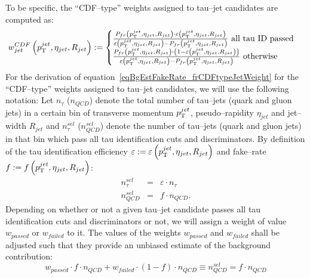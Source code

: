 To be specific, the ``CDF--type'' weights assigned to tau--jet candidates are
computed as:
\begin{equation}
w_{jet}^{CDF} \left( p_{\mathrm{T}}^{jet}, \eta_{jet}, R_{jet} \right) 
:= 
\begin{cases} 
   \frac{P_{fr} \left( p_{\mathrm{T}}^{jet}, \eta_{jet}, R_{jet} \right) \cdot 
         \varepsilon \left( p_{\mathrm{T}}^{jet}, \eta_{jet}, R_{jet} \right)}
        {\varepsilon \left( p_{\mathrm{T}}^{jet}, \eta_{jet}, R_{jet} \right) - P_{fr} \left( p_{\mathrm{T}}^{jet}, \eta_{jet}, R_{jet} \right)}~\mbox{all tau ID passed} \\
   \frac{P_{fr} \left( p_{\mathrm{T}}^{jet}, \eta_{jet}, R_{jet} \right) \cdot 
         \left( 1 - \varepsilon \left( p_{\mathrm{T}}^{jet}, \eta_{jet}, R_{jet} \right) \right)}
        {\varepsilon \left( p_{\mathrm{T}}^{jet}, \eta_{jet}, R_{jet} \right) - P_{fr} \left( p_{\mathrm{T}}^{jet}, \eta_{jet}, R_{jet} \right)}~\mbox{otherwise}
\end{cases}
\label{eqBgEstFakeRate_frCDFtypeJetWeight}
\end{equation}
For the derivation of equation~\ref{eqBgEstFakeRate_frCDFtypeJetWeight} for the
``CDF--type'' weights assigned to tau--jet candidates, we will use the following
notation: Let $n_{\tau}$ ($n_{QCD}$) denote the total number of tau--jets (quark
and gluon jets) in a certain bin of transverse momentum $p_{\mathrm{T}}^{jet}$,
pseudo--rapidity $\eta_{jet}$ and jet--width $R_{jet}$ and $n_{\tau}^{sel}$
($n_{QCD}^{sel}$) denote the number of tau--jets (quark and gluon jets) in that
bin which pass all tau identification cuts and discriminators.
By definition of the tau identification efficiency $\varepsilon := \varepsilon
\left( p_{\mathrm{T}}^{jet}, \eta_{jet}, R_{jet} \right)$ and fake--rate $f := f \left(
p_{\mathrm{T}}^{jet}, \eta_{jet}, R_{jet} \right)$:
\begin{eqnarray}
n_{\tau}^{sel} & = & \varepsilon \cdot n_{\tau} \nonumber \\
n_{QCD}^{sel} & = & f \cdot n_{QCD}.
\label{eqBgEstFakeRate_eff_and_frDef}
\end{eqnarray}
Depending on whether or not a given tau--jet candidate passes all tau
identification cuts and discriminators or not, we will assign a weight of value
$w_{passed}$ or $w_{failed}$ to it.
The values of the weights $w_{passed}$ and $w_{failed}$ shall be adjusted such
that they provide an unbiased estimate of the background contribution:
\begin{equation}
w_{passed} \cdot f \cdot n_{QCD} + w_{failed} \cdot \left( 1 - f \right) \cdot n_{QCD} \equiv n_{QCD}^{sel} = f \cdot n_{QCD}
\label{eqBgEstFakeRate_QCD}
\end{equation}
